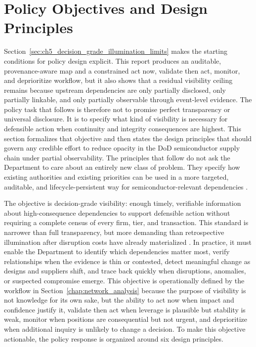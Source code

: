 \section{Policy Objectives and Design Principles}
\label{sec:ch5_policy_objectives_design_principles}

Section~\ref{sec:ch5_decision_grade_illumination_limits} makes the starting conditions for policy design explicit. This report produces an auditable, provenance-aware map and a constrained act now, validate then act, monitor, and deprioritize workflow, but it also shows that a residual visibility ceiling remains because upstream dependencies are only partially disclosed, only partially linkable, and only partially observable through event-level evidence. The policy task that follows is therefore not to promise perfect transparency or universal disclosure. It is to specify what kind of visibility is necessary for defensible action when continuity and integrity consequences are highest. This section formalizes that objective and then states the design principles that should govern any credible effort to reduce opacity in the DoD semiconductor supply chain under partial observability. The principles that follow do not ask the Department to care about an entirely new class of problem. They specify how existing authorities and existing priorities can be used in a more targeted, auditable, and lifecycle-persistent way for semiconductor-relevant dependencies \parencite{ch5_dodi520044,ch5_nist800161r1upd1,ch5_dod2022_supplychains}.

The objective is decision-grade visibility: enough timely, verifiable information about high-consequence dependencies to support defensible action without requiring a complete census of every firm, tier, and transaction. This standard is narrower than full transparency, but more demanding than retrospective illumination after disruption costs have already materialized \parencite{ch5_nist800161r1upd1}. In practice, it must enable the Department to identify which dependencies matter most, verify relationships when the evidence is thin or contested, detect meaningful change as designs and suppliers shift, and trace back quickly when disruptions, anomalies, or suspected compromise emerge. This objective is operationally defined by the workflow in Section~\ref{chap:network_analysis} because the purpose of visibility is not knowledge for its own sake, but the ability to act now when impact and confidence justify it, validate then act when leverage is plausible but stability is weak, monitor when positions are consequential but not urgent, and deprioritize when additional inquiry is unlikely to change a decision. To make this objective actionable, the policy response is organized around six design principles.

